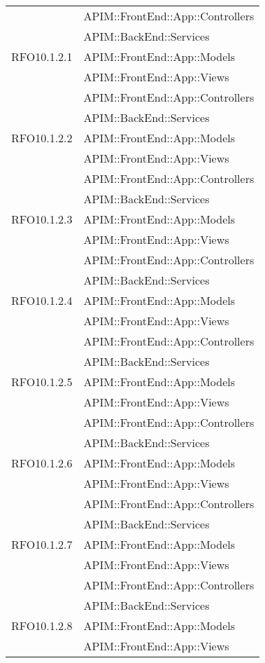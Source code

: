 \begin{longtable}{ p{4cm} | p{12cm} }
			& APIM::FrontEnd::App::Controllers \\
			& APIM::BackEnd::Services \\
			\hline	
			RFO10.1.2.1
			& APIM::FrontEnd::App::Models \\
			& APIM::FrontEnd::App::Views \\
			& APIM::FrontEnd::App::Controllers \\
			& APIM::BackEnd::Services \\
			\hline	
			RFO10.1.2.2
			& APIM::FrontEnd::App::Models \\
			& APIM::FrontEnd::App::Views \\
			& APIM::FrontEnd::App::Controllers \\
			& APIM::BackEnd::Services \\
			\hline	
			RFO10.1.2.3
			& APIM::FrontEnd::App::Models \\
			& APIM::FrontEnd::App::Views \\
			& APIM::FrontEnd::App::Controllers \\
			& APIM::BackEnd::Services \\
			\hline	
			RFO10.1.2.4
			& APIM::FrontEnd::App::Models \\
			& APIM::FrontEnd::App::Views \\
			& APIM::FrontEnd::App::Controllers \\
			& APIM::BackEnd::Services \\
			\hline	
			RFO10.1.2.5
			& APIM::FrontEnd::App::Models \\
			& APIM::FrontEnd::App::Views \\
			& APIM::FrontEnd::App::Controllers \\
			& APIM::BackEnd::Services \\
			\hline	
			RFO10.1.2.6
			& APIM::FrontEnd::App::Models \\
			& APIM::FrontEnd::App::Views \\
			& APIM::FrontEnd::App::Controllers \\
			& APIM::BackEnd::Services \\
			\hline	
			RFO10.1.2.7
			& APIM::FrontEnd::App::Models \\
			& APIM::FrontEnd::App::Views \\
			& APIM::FrontEnd::App::Controllers \\
			& APIM::BackEnd::Services \\
			\hline	
			RFO10.1.2.8
			& APIM::FrontEnd::App::Models \\
			& APIM::FrontEnd::App::Views \\

\end{longtable}
